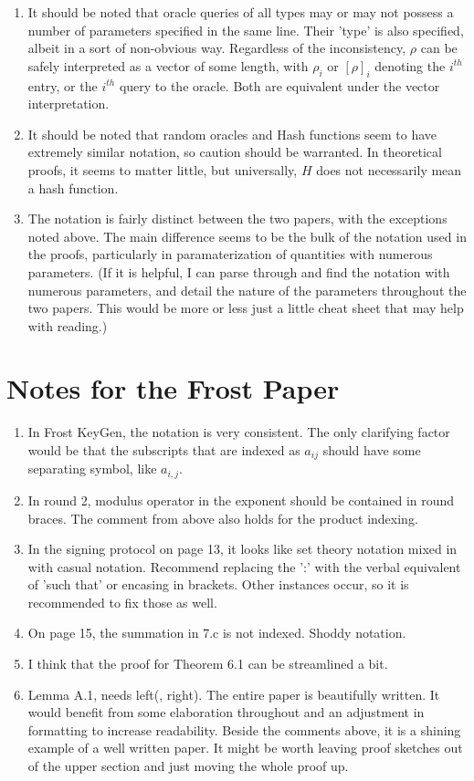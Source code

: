 \documentclass[12pt,titlepage]{article}
\begin{document}
\begin{enumerate}
\item It should be noted that oracle queries of all types may or may not possess a number of parameters specified in the same line. Their 'type' is also specified, albeit in a sort of non-obvious way. Regardless of the inconsistency, $\rho$ can be safely interpreted as a vector of some length, with $\rho_i$ or $\left [ \rho \right ]_i$ denoting the $i^{th}$ entry, or the $i^{th}$ query to the oracle. Both are equivalent under the vector interpretation.
\item It should be noted that random oracles and Hash functions seem to have extremely similar notation, so caution should be warranted. In theoretical proofs, it seems to matter little, but universally, $H$ does not necessarily mean a hash function.
\item The notation is fairly distinct between the two papers, with the exceptions noted above. The main difference seems to be the bulk of the notation used in the proofs, particularly in paramaterization of quantities with numerous parameters. (If it is helpful, I can parse through and find the notation with numerous parameters, and detail the nature of the parameters throughout the two papers. This would be more or less just a little cheat sheet that may help with reading.)
\end{enumerate}

\section{Notes for the Frost Paper}
\begin{enumerate}
\item In Frost KeyGen, the notation is very consistent. The only clarifying factor would be that the subscripts that are indexed as $a_{i j}$ should have some separating symbol, like $a_{i,j}$.
\item In round 2, modulus operator in the exponent should be contained in round braces. The comment from above also holds for the product indexing.
\item  In the signing protocol on page 13, it looks like set theory notation mixed in with casual notation. Recommend replacing the ':' with the verbal equivalent of 'such that' or encasing in brackets. Other instances occur, so it is recommended to fix those as well.
\item  On page 15, the summation in 7.c is not indexed. Shoddy notation.
\item I think that the proof for Theorem 6.1 can be streamlined a bit.
\item Lemma A.1, needs left(, right).
The entire paper is beautifully written. It would benefit from some elaboration throughout and an adjustment in formatting to increase readability. Beside the comments above, it is a shining example of a well written paper. It might be worth leaving proof sketches out of the upper section and just moving the whole proof up.  
\end{enumerate}
\end{document}
